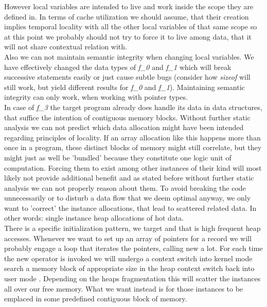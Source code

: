 However local variables are intended to live and work inside the scope they are defined in. In terms of cache utilization we should assume, that their creation implies temporal locality with all the other local variables of that same scope so at this point we probably should not try to force it to live among data, that it will not share contextual relation with.\\
Also we can not maintain semantic integrity when changing local variables. We have effectively changed the data types of \textit{f\_0} and \textit{f\_1} which will break successive statements easily or just cause subtle bugs (consider how \textit{sizeof} will still work, but yield different results for \textit{f\_0} and \textit{f\_1}). Maintaining semantic integrity can only work, when working with pointer types.\\
In case of \textit{f\_3} the target program already does handle its data in data structures, that suffice the intention of contiguous memory blocks. Without further static analysis we can not predict which data allocation might have been intended regarding principles of locality. If an array allocation like this happens more than once in a program, these distinct blocks of memory might still correlate, but they might just as well be 'bundled' because they constitute one logic unit of computation. Forcing them to exist among other instances of their kind will most likely not provide additional benefit and as stated before without further static analysis we can not properly reason about them. To avoid breaking the code unnecessarily or to disturb a data flow that we deem optimal anyway, we only want to 'correct' the instance allocations, that lead to scattered related data. In other words: single instance heap allocations of hot data.\\
There is a specific initialization pattern, we target and that is high frequent heap accesses. Whenever we want to set up an array of pointers for a record we will probably engage a loop that iterates the pointers, calling new a lot. For each time the new operator is invoked we will undergo a context switch into kernel mode search a memory block of appropriate size in the heap context switch back into user mode . Depending on the heaps fragmentation this will scatter the instances all over our free memory. What we want instead is for those instances to be emplaced in some predefined contiguous block of memory.


